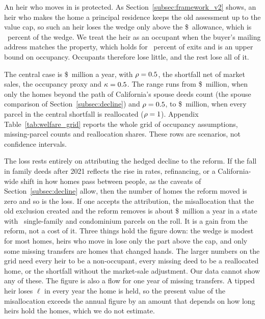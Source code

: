 An heir who moves in is protected. As Section~\ref{subsec:framework_v2} shows, an heir who makes the home a principal residence keeps the old assessment up to the value cap, so such an heir loses the wedge only above the \$\WViValueCap\ allowance, which is \WViShareAboveCap\ percent of the wedge. We treat the heir as an occupant when the buyer's mailing address matches the property, which holds for \WViOccupancyShare\ percent of exits and is an upper bound on occupancy. Occupants therefore lose little, and the rest lose all of it.

The central case is \$\WViLossCentral\ million a year, with $\rho=0.5$, the shortfall net of market sales, the occupancy proxy and $\kappa=0.5$. The range runs from \$\WViLossLow\ million, when only the homes beyond the path of California's spouse deeds count (the spouse comparison of Section~\ref{subsec:decline}) and $\rho=0.5$, to \$\WViLossHigh\ million, when every parcel in the central shortfall is reallocated ($\rho=1$). Appendix Table~\ref{tab:welfare_grid} reports the whole grid of occupancy assumptions, missing-parcel counts and reallocation shares. These rows are scenarios, not confidence intervals.

The loss rests entirely on attributing the hedged decline to the reform. If the fall in family deeds after 2021 reflects the rise in rates, refinancing, or a California-wide shift in how homes pass between people, as the caveats of Section~\ref{subsec:decline} allow, then the number of homes the reform moved is zero and so is the loss. If one accepts the attribution, the misallocation that the old exclusion created and the reform removes is about \$\WViLossCentral\ million a year in a state with \WedgeParcels\ single-family and condominium parcels on the roll. It is a gain from the reform, not a cost of it. Three things hold the figure down: the wedge is modest for most homes, heirs who move in lose only the part above the cap, and only some missing transfers are homes that changed hands. The larger numbers on the grid need every heir to be a non-occupant, every missing deed to be a reallocated home, or the shortfall without the market-sale adjustment. Our data cannot show any of these. The figure is also a flow for one year of missing transfers. A tipped heir loses $\ell$ in every year the home is held, so the present value of the misallocation exceeds the annual figure by an amount that depends on how long heirs hold the homes, which we do not estimate.


